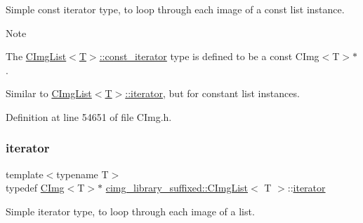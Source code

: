 Simple const iterator type, to loop through each image of a {\ttfamily const} list instance. 

\begin{DoxyNote}{Note}

\begin{DoxyItemize}
\item The {\ttfamily \hyperlink{structcimg__library__suffixed_1_1CImgList_aabe27c2b223cefcbdf081b4a7220a12c}{C\+Img\+List$<$\+T$>$\+::const\+\_\+iterator}} type is defined to be a {\ttfamily const C\+Img$<$\+T$>$$\ast$}.
\item Similar to \hyperlink{structcimg__library__suffixed_1_1CImgList_a9d3e27da63f536e04fc7249f8e13dba0}{C\+Img\+List$<$\+T$>$\+::iterator}, but for constant list instances. 
\end{DoxyItemize}
\end{DoxyNote}


Definition at line 54651 of file C\+Img.\+h.

\mbox{\label{structcimg__library__suffixed_1_1CImgList_a9d3e27da63f536e04fc7249f8e13dba0}} 
\subsubsection{\texorpdfstring{iterator}{iterator}}
{\footnotesize\ttfamily template$<$typename T$>$ \\
typedef \hyperlink{structcimg__library__suffixed_1_1CImg}{C\+Img}$<$T$>$$\ast$ \hyperlink{structcimg__library__suffixed_1_1CImgList}{cimg\+\_\+library\+\_\+suffixed\+::\+C\+Img\+List}$<$ T $>$\+::\hyperlink{structcimg__library__suffixed_1_1CImgList_a9d3e27da63f536e04fc7249f8e13dba0}{iterator}}



Simple iterator type, to loop through each image of a list. 

